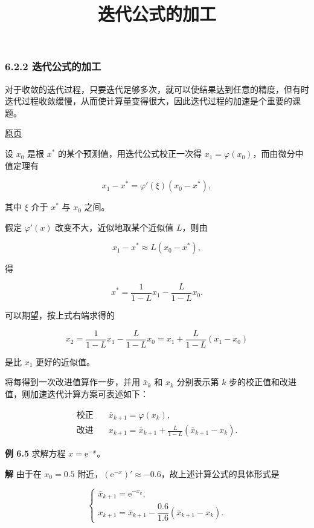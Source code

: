 \documentclass[
  10pt,
  fontset=fandol]{ctexart}
\title{迭代公式的加工}
\author{}
\date{}
\begin{document}
\maketitle

\subsubsection{6.2.2 迭代公式的加工}\label{ux8fedux4ee3ux516cux5f0fux7684ux52a0ux5de5}

对于收敛的迭代过程，只要迭代足够多次，就可以使结果达到任意的精度，但有时迭代过程收敛缓慢，从而使计算量变得很大，因此迭代过程的加速是个重要的课题。

\href{../../source-images/pdf-161.jpeg}{原页}

设 \(x_0\) 是根 \(x^*\) 的某个预测值，用迭代公式校正一次得 \(x_1=\varphi(x_0)\)，而由微分中值定理有

\[
x_1-x^*=\varphi'(\xi)(x_0-x^*),
\]

其中 \(\xi\) 介于 \(x^*\) 与 \(x_0\) 之间。

假定 \(\varphi'(x)\) 改变不大，近似地取某个近似值 \(L\)，则由

\[
x_1-x^*\approx L(x_0-x^*),
\]

得

\[
x^*=\frac{1}{1-L}x_1-\frac{L}{1-L}x_0.
\tag{6.2.9}
\]

可以期望，按上式右端求得的

\[
x_2=\frac{1}{1-L}x_1-\frac{L}{1-L}x_0=x_1+\frac{L}{1-L}(x_1-x_0)
\]

是比 \(x_1\) 更好的近似值。

将每得到一次改进值算作一步，并用 \(\bar{x}_k\) 和 \(x_k\) 分别表示第 \(k\) 步的校正值和改进值，则加速迭代计算方案可表述如下：

\[
\begin{aligned}
\text{校正}\quad&\bar{x}_{k+1}=\varphi(x_k),\\
\text{改进}\quad&x_{k+1}=\bar{x}_{k+1}+\frac{L}{1-L}(\bar{x}_{k+1}-x_k).
\end{aligned}
\tag{6.2.10}
\]

\textbf{例 6.5} 求解方程 \(x=\mathrm{e}^{-x}\)。

\textbf{解} 由于在 \(x_0=0.5\) 附近，\((\mathrm{e}^{-x})'\approx-0.6\)，故上述计算公式的具体形式是

\[
\begin{cases}
\bar{x}_{k+1}=\mathrm{e}^{-x_k},\\
x_{k+1}=\bar{x}_{k+1}-\dfrac{0.6}{1.6}(\bar{x}_{k+1}-x_k).
\end{cases}
\]
\end{document}
